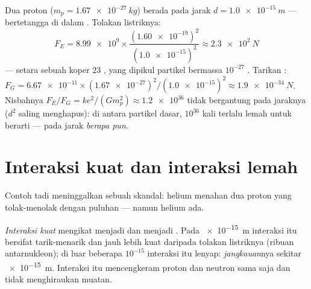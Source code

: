 \begin{example}\label{ex:g11:fundamental-interactions:protons}
Dua proton ($m_p = \qty{1.67e-27}{kg}$) berada pada jarak
$d = \qty{1.0e-15}{m}$ --- bertetangga di dalam . Tolakan
listriknya:
\[
F_E = \num{8.99e9} \times
\frac{(\num{1.60e-19})^{2}}{(\num{1.0e-15})^{2}}
\approx \qty{2.3e2}{N}
\]
--- setara  sebuah koper $23$ , yang dipikul partikel
bermassa $10^{-27}$ . Tarikan :
$F_G = \num{6.67e-11} \times (\num{1.67e-27})^{2} /
(\num{1.0e-15})^{2} \approx \qty{1.9e-34}{N}$. Nisbahnya
$F_E / F_G = k e^{2} / (G m_p^{2}) \approx \num{1.2e36}$ tidak
bergantung pada jaraknya ($d^{2}$ saling menghapus): di antara partikel
dasar,  $10^{36}$ kali terlalu lemah untuk berarti --- pada
jarak \emph{berapa pun}.
\end{example}

\section{Interaksi kuat dan interaksi lemah}

Contoh tadi meninggalkan sebuah skandal:  helium menahan dua
proton yang tolak-menolak dengan puluhan  --- namun helium ada.

\begin{definition}\label{def:g11:fundamental-interactions:strong}
\emph{Interaksi kuat} mengikat  menjadi
 dan  menjadi . Pada \qty{e-15}{m} interaksi itu
bersifat tarik-menarik dan jauh lebih kuat daripada tolakan listriknya
(ribuan  antarnukleon); di luar beberapa $10^{-15}$ 
interaksi itu lenyap: \emph{jangkauan}nya sekitar \qty{e-15}{m}. Interaksi itu mencengkeram proton
dan neutron sama saja dan tidak menghiraukan muatan.
\end{definition}

